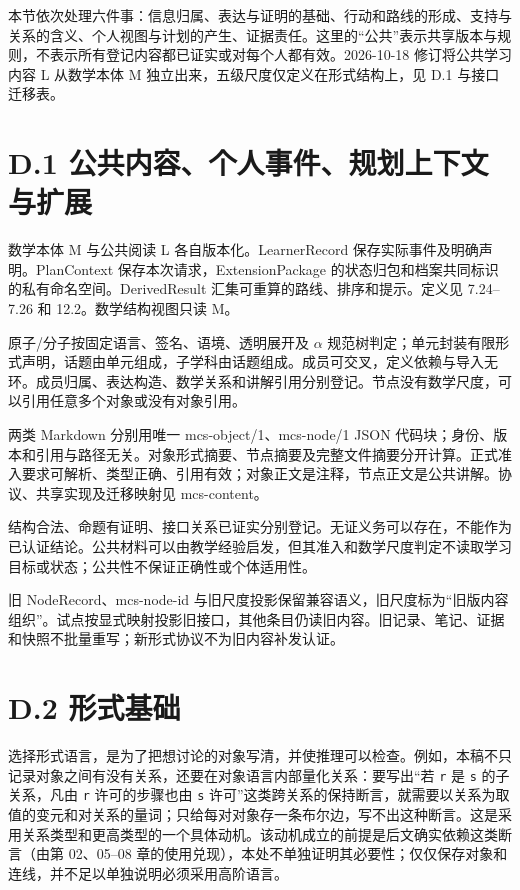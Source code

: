 \documentclass[UTF8,a4paper,zihao=-4,fontset=windows,openany]{ctexbook}
\newcommand{\mcsbrk}{\penalty 200\relax}
\begin{document}
本节依次处理六件事：信息归属、表达与证明的基础、行动和路线的形成、支持与关系的含义、个人视图与计划的产生、证据责任。这里的“公共”表示共享版本与规则，不表示所有登记内容都已证实或对每个人都有效。2026-10-18 修订将公共学习内容 L 从数学本体 M 独立出来，五级尺度仅定义在形式结构上，见 D.1 与接口迁移表。

\section{D.1 公共内容、个人事件、规划上下文与扩展}
数学本体 M 与公共阅读 L 各自版本化。LearnerRecord 保存实际事件及明确声明。PlanContext 保存本次请求，Extens\mcsbrk{}ionPac\mcsbrk{}kage 的状态归包和档案共同标识的私有命名空间。DerivedResult 汇集可重算的路线、排序和提示。定义见 7.24–7.26 和 12.2。数学结构视图只读 M。

原子/分子按固定语言、签名、语境、透明展开及 \(\alpha\) 规范树判定；单元封装有限形式声明，话题由单元组成，子学科由话题组成。成员可交叉，定义依赖与导入无环。成员归属、表达构造、数学关系和讲解引用分别登记。节点没有数学尺度，可以引用任意多个对象或没有对象引用。

两类 Markdown 分别用唯一 mcs-object/1、mcs-node/1 JSON 代码块；身份、版本和引用与路径无关。对象形式摘要、节点摘要及完整文件摘要分开计算。正式准入要求可解析、类型正确、引用有效；对象正文是注释，节点正文是公共讲解。协议、共享实现及迁移映射见 mcs-content。

结构合法、命题有证明、接口关系已证实分别登记。无证义务可以存在，不能作为已认证结论。公共材料可以由教学经验启发，但其准入和数学尺度判定不读取学习目标或状态；公共性不保证正确性或个体适用性。

旧 NodeRecord、mcs-node-id 与旧尺度投影保留兼容语义，旧尺度标为“旧版内容组织”。试点按显式映射投影旧接口，其他条目仍读旧内容。旧记录、笔记、证据和快照不批量重写；新形式协议不为旧内容补发认证。

\section{D.2 形式基础}
选择形式语言，是为了把想讨论的对象写清，并使推理可以检查。例如，本稿不只记录对象之间有没有关系，还要在对象语言内部量化关系：要写出“若 \texttt{r} 是 \texttt{s} 的子关系，凡由 \texttt{r} 许可的步骤也由 \texttt{s} 许可”这类跨关系的保持断言，就需要以关系为取值的变元和对关系的量词；只给每对对象存一条布尔边，写不出这种断言。这是采用关系类型和更高类型的一个具体动机。该动机成立的前提是后文确实依赖这类断言（由第 02、05–08 章的使用兑现），本处不单独证明其必要性；仅仅保存对象和连线，并不足以单独说明必须采用高阶语言。
\end{document}
